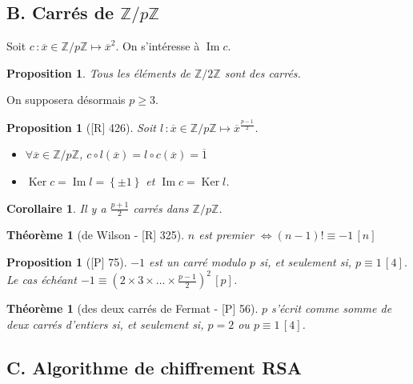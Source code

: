 \documentclass[10pt, a4paper, parskip=full, twoside, twocolumn]{report}
\newtheorem{theorem}[definition]{Théorème}
\newtheorem{proposition}[definition]{Proposition}
\newtheorem{corollary}[definition]{Corollaire}
\newcommand{\IZ}{\mathbb{Z}}
\DeclareMathOperator{\im}{Im}
\DeclareMathOperator{\Ker}{Ker}
\begin{document}
\subsection*{B. Carrés de $\IZ/p\IZ$}
Soit $c\,\colon \overline{x}\in\IZ/p\IZ \mapsto \overline{x}^2$.
On s'intéresse à $\im c$.

\begin{proposition}
	Tous les éléments de $\IZ/2\IZ$ sont des carrés.
\end{proposition}
On supposera désormais $p\geq 3$.

\begin{proposition}[\textnormal{[R] 426}]
	Soit $l\,\colon \overline{x}\in\IZ/p\IZ \mapsto \overline{x}^{\frac{p-1}{2}}$.
	\begin{itemize}
		\item $\forall \overline{x}\in\IZ/p\IZ$, $c\circ l(\overline{x}) = l\circ c(\overline{x}) = \overline{1}$
		\item $\Ker c = \im l =\left\{\pm 1\right\}$ et $\im c = \Ker l$.
	\end{itemize}
\end{proposition}

\begin{corollary}
	Il y a $\frac{p+1}{2}$ carrés dans $\IZ/p\IZ$.
\end{corollary}

\begin{theorem}[de Wilson - \textnormal{[R] 325}]
	$n$ est premier $\iff (n-1)! \equiv -1\, [n]$
\end{theorem}

\begin{proposition}[\textnormal{[P] 75}]
	$-1$ est un carré modulo $p$ si, et seulement si, $p\equiv 1\,[4]$. Le cas échéant $-1\equiv (2\times 3\times\dots\times \frac{p-1}{2})^2\,[p]$.
\end{proposition}

\begin{theorem}[des deux carrés de Fermat - \textnormal{[P] 56}]
	$p$ s'écrit comme somme de deux carrés d'entiers si, et seulement si, $p=2$ ou $p \equiv 1\,[4]$.
\end{theorem}

\subsection*{C. Algorithme de chiffrement RSA}
\end{document}

